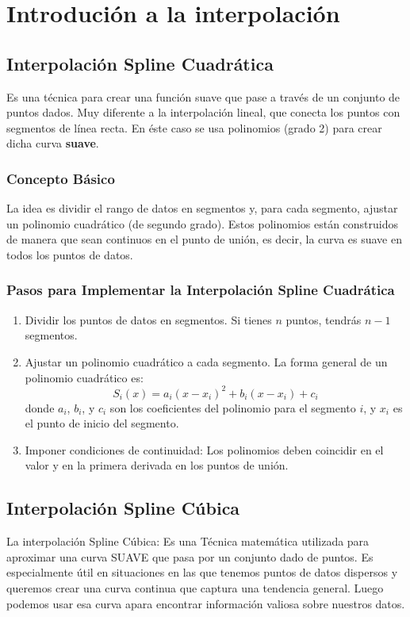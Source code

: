 \documentclass[12pt]{article}
\author{Vale Fernando Alexis}
\begin{document}
\section{Introdución a la interpolación}
  \subsection{Interpolación Spline Cuadrática}
  Es una técnica para crear una función suave que pase a través de un conjunto 
  de puntos dados. Muy diferente a la interpolación lineal, que conecta los puntos 
  con segmentos de línea recta. En éste caso se usa polinomios (grado 2) para crear
  dicha curva \textbf{suave}.\par
    \subsubsection{Concepto Básico}
    La idea es dividir el rango de datos en segmentos y, para cada segmento, ajustar 
    un polinomio cuadrático (de segundo grado). Estos polinomios están construidos de 
    manera que sean continuos en el punto de unión, es decir, la curva es suave en todos 
    los puntos de datos.
    \subsubsection{Pasos para Implementar la Interpolación Spline Cuadrática}
     \begin{enumerate}
        \item Dividir los puntos de datos en segmentos. Si tienes $n$ puntos, tendrás $n-1$ segmentos.
        \item Ajustar un polinomio cuadrático a cada segmento. La forma general de un polinomio cuadrático es:
        \[S_i(x) = a_i (x - x_i)^2 + b_i (x - x_i) + c_i\]
        donde $a_i$, $b_i$, y $c_i$ son los coeficientes del polinomio para el segmento $i$, y $x_i$ es el punto 
        de inicio del segmento.
        \item Imponer condiciones de continuidad: Los polinomios deben coincidir en el valor y en la primera 
        derivada en los puntos de unión.
      \end{enumerate}

\subsection{Interpolación Spline Cúbica}
La interpolación Spline Cúbica: Es una Técnica matemática utilizada para 
aproximar una curva SUAVE que pasa por un conjunto dado de puntos. Es especialmente
útil en situaciones en las que tenemos puntos de datos dispersos y queremos crear 
una curva continua que captura una tendencia general.
Luego podemos usar esa curva apara encontrar información valiosa sobre nuestros
datos. 
\end{document}
